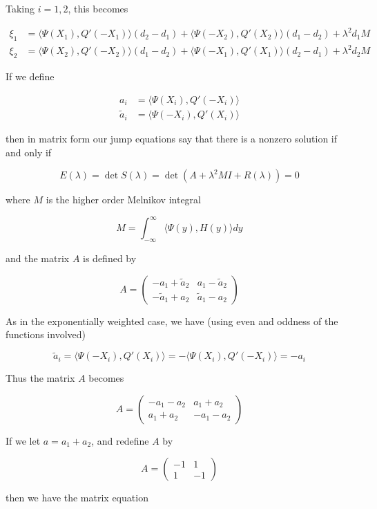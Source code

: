\documentclass[12pt]{article}
\begin{document}
\begin{enumerate}
Taking $i = 1, 2$, this becomes

\begin{align*}
\xi_1 &= \langle \Psi(X_1), Q'(-X_1) \rangle (d_2 - d_1 ) + \langle \Psi(-X_2), Q'(X_2) \rangle (d_1 - d_2 ) + \lambda^2 d_1 M \\
\xi_2 &= \langle \Psi(X_2), Q'(-X_2) \rangle (d_1 - d_2 ) + \langle \Psi(-X_1), Q'(X_1) \rangle (d_2 - d_1 ) + \lambda^2 d_2 M
\end{align*}

If we define

\begin{align*}
a_i &= \langle \Psi (X_i), Q'(-X_i) \rangle \\
\tilde{a}_i &= \langle \Psi(-X_i), Q'(X_i) \rangle
\end{align*}

then in matrix form our jump equations say that there is a nonzero solution if and only if

\[
E(\lambda) = \det S(\lambda) = \det(A + \lambda^2 MI + R(\lambda) ) = 0
\]

where $M$ is the higher order Melnikov integral

\[
M = \int_{-\infty}^\infty \langle \Psi(y), H(y) \rangle dy
\]

and the matrix $A$ is defined by

\[
A = 
\begin{pmatrix}
-a_1 + \tilde{a}_2 & a_1 - \tilde{a}_2 \\
-\tilde{a}_1 + a_2 & \tilde{a}_1 - a_2 
\end{pmatrix}
\]

As in the exponentially weighted case, we have (using even and oddness of the functions involved)

\[
\tilde{a}_i = \langle \Psi(-X_i), Q'(X_i) \rangle = -\langle \Psi(X_i), Q'(-X_i) \rangle = -a_i
\]

Thus the matrix $A$ becomes

\[
A = 
\begin{pmatrix}
-a_1 - a_2 & a_1 + a_2 \\
a_1 + a_2 & -a_1 - a_2 
\end{pmatrix}
\]

If we let $a = a_1 + a_2$, and redefine $A$ by

\[
A = 
\begin{pmatrix}
-1 & 1 \\
1 & -1
\end{pmatrix}
\]

then we have the matrix equation


\end{enumerate}
\end{document}
